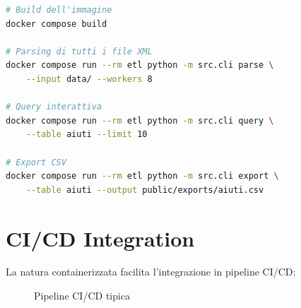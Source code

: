 \begin{lstlisting}[language=bash, caption=Comandi Docker tipici]
# Build dell'immagine
docker compose build

# Parsing di tutti i file XML
docker compose run --rm etl python -m src.cli parse \
    --input data/ --workers 8

# Query interattiva
docker compose run --rm etl python -m src.cli query \
    --table aiuti --limit 10

# Export CSV
docker compose run --rm etl python -m src.cli export \
    --table aiuti --output public/exports/aiuti.csv
\end{lstlisting}

\section{CI/CD Integration}

La natura containerizzata facilita l'integrazione in pipeline CI/CD:

\begin{figure}[h]
\centering
{}
\caption{Pipeline CI/CD tipica}
\end{figure}
